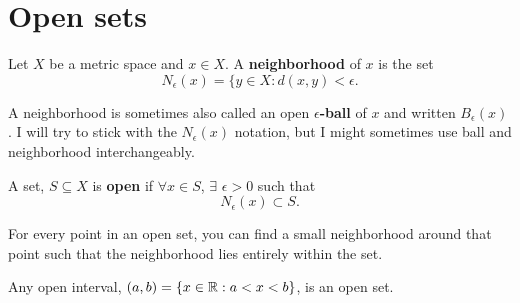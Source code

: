 \section{Open sets}

\begin{definition}
  Let $X$ be a metric space and $x \in X$. A \textbf{neighborhood} of
  $x$ is the set 
  \[ N_\epsilon (x) = \{y \in X: d(x,y) < \epsilon. \]
\end{definition}
A neighborhood is sometimes also called an open
$\epsilon$\textbf{-ball} of $x$ and written $B_{\epsilon}(x)$. I will
try to stick with the $N_\epsilon(x)$ notation, but I might sometimes
use ball and neighborhood interchangeably.
\begin{definition}
  A set, $S \subseteq X$ is \textbf{open} if $\forall x \in S$,
  $\exists$ $\epsilon>0$ such that 
  \[ N_\epsilon(x) \subset S. \]
\end{definition}
For every point in an open set, you can find a small neighborhood
around that point such that the neighborhood lies entirely within the
set. 
\begin{example}
  Any open interval, $(a,b) = \{x \in \mathbb{R}: a<x<b\}$, is an open set. 
\end{example}


